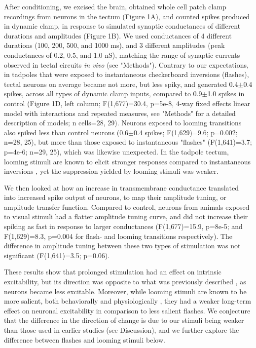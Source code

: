\documentclass{article}
\begin{document}
After conditioning, we excised the brain, obtained whole cell patch clamp recordings from neurons in the tectum (Figure 1A), and counted spikes produced in dynamic clamp, in response to simulated synaptic conductances of different durations and amplitudes (Figure 1B). We used conductances of 4 different durations (100, 200, 500, and 1000 ms), and 3 different amplitudes (peak conductances of 0.2, 0.5, and 1.0 nS), matching the range of synaptic currents observed in tectal circuits \textit{in vivo} (see "Methods"). Contrary to our expectations, in tadpoles that were exposed to instantaneous checkerboard inversions (flashes), tectal neurons on average became not more, but less spiky, and generated 0.4$\pm$0.4 spikes, across all types of dynamic clamp inputs, compared to 0.9$\pm$1.0 spikes in control (Figure 1D, left column; F(1,677)=30.4, p=5e-8, 4-way fixed effects linear model with interactions and repeated measures, see "Methods" for a detailed description of models; n cells=28, 29). Neurons exposed to looming transitions also spiked less than control neurons (0.6$\pm$0.4 spikes; F(1,629)=9.6; p=0.002; n=28, 25), but more than those exposed to instantaneous "flashes" (F(1,641)=3.7; p=4e-6; n=29, 25), which was likewise unexpected. In the tadpole tectum, looming stimuli are known to elicit stronger responses compared to instantaneous inversions \citep{khakhalin2014}, yet the suppression yielded by looming stimuli was weaker.

We then looked at how an increase in transmembrane conductance translated into increased spike output of neurons, to map their amplitude tuning, or amplitude transfer function. Compared to control, neurons from animals exposed to visual stimuli had a flatter amplitude tuning curve, and did not increase their spiking as fast in response to larger conductances (F(1,677)=15.9, p=8e-5; and F(1,629)=8.3, p=0.004 for flash- and looming transitions respectively). The difference in amplitude tuning between these two types of stimulation was not significant (F(1,641)=3.5; p=0.06).

These results show that prolonged stimulation had an effect on intrinsic excitability, but its direction was opposite to what was previously described \citep{aizenman2003,ciarleglio2015}, as neurons became less excitable. Moreover, while looming stimuli are known to be more salient, both behaviorally and physiologically \citep{khakhalin2014}, they had a weaker long-term effect on neuronal excitability in comparison to less salient flashes. We conjecture that the difference in the direction of change is due to our stimuli being weaker than those used in earlier studies (see Discussion), and we further explore the difference between flashes and looming stimuli below.
\end{document}
